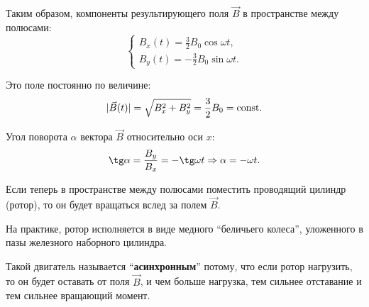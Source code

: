 	Таким образом, компоненты результирующего поля \( \vec{B} \) в пространстве
    между полюсами:
	\[
        \left\{
        \begin{array}{l}
            B_{x}(t) = \frac{3}{2}B_0\cos\omega t, \\
            B_{y}(t) = -\frac{3}{2}B_0\sin\omega t.
        \end{array}
        \right.
    \]
	
	Это поле постоянно по величине:
	\[
        |\vec{B}(t)| = \sqrt{B_{x}^2 + B_{y}^2} = \frac{3}{2}B_0 = \mathrm{const}.
    \]
	
	Угол поворота \( \alpha \) вектора \( \vec{B} \) относительно оси \( x \):
	\[
        \tg\alpha = \frac{B_{y}}{B_{x}} = -\tg\omega t \Rightarrow
        \alpha = -\omega t.
    \]
	
	Если теперь в пространстве между полюсами поместить проводящий цилиндр
    (ротор), то он будет вращаться вслед за полем \( \vec{B} \).
	
	На практике, ротор исполняется в виде медного “беличьего колеса”, уложенного
    в пазы железного наборного цилиндра.
    
    Такой двигатель называется “\textbf{асинхронным}” потому, что если ротор
    нагрузить, то он будет оставать от поля \( \vec{B} \), и чем больше
    нагрузка, тем сильнее отставание и тем сильнее вращающий момент.
